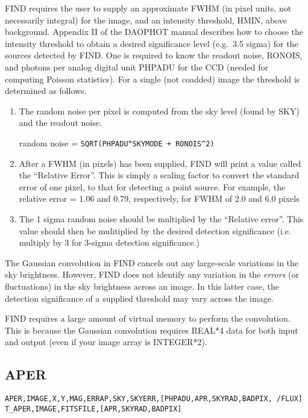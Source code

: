 FIND requires the user to supply an
approximate FWHM (in pixel units, not necessarily integral) for the image,
and an intensity threshold,
HMIN, above background.  Appendix II of the DAOPHOT manual describes
how to choose the intensity threshold to obtain a desired significance
level (e.g.\ 3.5 sigma) for the sources detected by FIND.
One is required to know the readout noise, RONOIS, and photons per
analog digital unit PHPADU for the CCD (needed for computing Poisson
statistics).  For a single (not coadded) image 
the threshold is determined as follows.
\begin{enumerate}
\item The random noise per pixel is computed from the sky level (found by
SKY) and the readout noise.
\begin{center}
random noise = {\tt SQRT(PHPADU$\ast$SKYMODE + RONOIS^2)}
\end{center}
\item After a FWHM (in pixels) 
has been supplied, FIND will print a value called the
``Relative Error''.  This is simply a scaling factor to convert the standard
error of one pixel, to that for detecting a point source.  For example,
the relative error = 1.06 and 0.79, respectively, for FWHM of 2.0 and 6.0
pixels
\item The 1 sigma random noise should be multiplied by the ``Relative error''.
This value should then be mulitiplied by the desired detection significance
(i.e. multiply by 3 for 3-sigma detection significance.)    
\end{enumerate}

The Gaussian convolution in FIND cancels out any large-scale variations
in the sky brightness.  However, FIND does not identify any variation 
in the {\em errors} (or fluctuations) in the sky brightness across an image.   
In this latter case, the detection significance of a supplied threshold 
may vary across the image.

FIND requires a large amount of virtual memory to perform the convolution.
This is because the Gaussian convolution requires REAL*4 data for both
input and output (even if your image array is INTEGER*2).  
\subsection{APER}
{\tt APER,IMAGE,X,Y,MAG,ERRAP,SKY,SKYERR,[PHPADU,APR,SKYRAD,BADPIX, /FLUX]} \\
{\tt T\_APER,IMAGE,FITSFILE,[APR,SKYRAD,BADPIX]} \\

